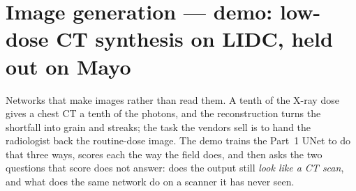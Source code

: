 
\section{Image generation --- demo: low-dose CT synthesis on LIDC, held out on Mayo}
\label{sec:bestiary_ct_synthesis}

Networks that make images rather than read them. A tenth of the X-ray dose
gives a chest CT a tenth of the photons, and the reconstruction turns the
shortfall into grain and streaks; the task the vendors sell is to hand the
radiologist back the routine-dose image. The demo trains the Part~1 UNet to
do that three ways, scores each the way the field does, and then asks the
two questions that score does not answer: does the output still
\emph{look like a CT scan}, and what does the same network do on a scanner
it has never seen.

